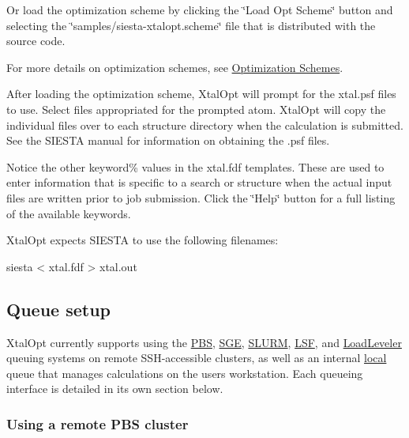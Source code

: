 \begin{DoxyCode}
\end{DoxyCode}


Or load the optimization scheme by clicking the \char`\"{}\+Load Opt Scheme\char`\"{} button and selecting the \char`\"{}samples/siesta-\/xtalopt.\+scheme\char`\"{} file that is distributed with the source code.

For more details on optimization schemes, see \hyperlink{optschemes}{Optimization Schemes}.

After loading the optimization scheme, Xtal\+Opt will prompt for the xtal.\+psf files to use. Select files appropriated for the prompted atom. Xtal\+Opt will copy the individual files over to each structure directory when the calculation is submitted. See the S\+I\+E\+S\+T\+A manual for information on obtaining the .psf files.

Notice the other keyword\% values in the xtal.\+fdf templates. These are used to enter information that is specific to a search or structure when the actual input files are written prior to job submission. Click the \char`\"{}\+Help\char`\"{} button for a full listing of the available keywords.

Xtal\+Opt expects S\+I\+E\+S\+T\+A to use the following filenames\+:


\begin{DoxyPre}siesta < xtal.fdf > xtal.out\end{DoxyPre}
\hypertarget{tut-xo_qisetup}{}\subsection{Queue setup}\label{tut-xo_qisetup}
Xtal\+Opt currently supports using the \hyperlink{tut-xo_remotepbs}{P\+B\+S}, \hyperlink{tut-xo_remotesge}{S\+G\+E}, \hyperlink{tut-xo_remoteslurm}{S\+L\+U\+R\+M}, \hyperlink{tut-xo_remotelsf}{L\+S\+F}, and \hyperlink{tut-xo_remotell}{Load\+Leveler} queuing systems on remote S\+S\+H-\/accessible clusters, as well as an internal \hyperlink{tut-xo_localqi}{local} queue that manages calculations on the user\textquotesingle{}s workstation. Each queueing interface is detailed in its own section below.\hypertarget{tut-xo_remotepbs}{}\subsubsection{Using a remote P\+B\+S cluster}\label{tut-xo_remotepbs}
 
